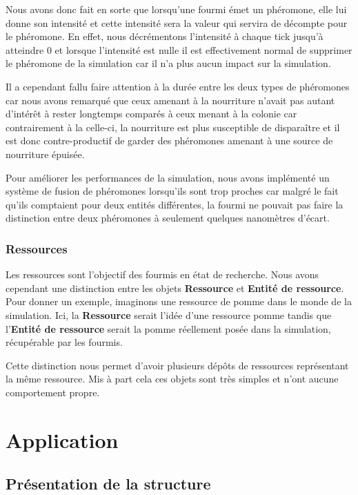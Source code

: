 \documentclass{EPUProjetDi}
\begin{document}
Nous avons donc fait en sorte que lorsqu'une fourmi émet un phéromone, elle lui donne son intensité et cette intensité sera la valeur qui servira de décompte
pour le phéromone. En effet, nous décrémentons l'intensité à chaque tick jusqu'à atteindre 0 et lorsque l'intensité est nulle il est effectivement normal 
de supprimer le phéromone de la simulation car il n'a plus aucun impact sur la simulation.

Il a cependant fallu faire attention à la durée entre les deux types de phéromones car nous avons remarqué que ceux amenant à la nourriture n'avait 
pas autant d'intérêt à rester longtemps comparés à ceux menant à la colonie car contrairement à la celle-ci, la nourriture est plus susceptible de 
disparaître et il est donc contre-productif de garder des phéromones amenant à une source de nourriture épuisée.

Pour améliorer les performances de la simulation, nous avons implémenté un système de fusion de phéromones lorsqu'ils sont trop proches car malgré 
le fait qu'ils comptaient pour deux entités différentes, la fourmi ne pouvait pas faire la distinction entre deux phéromones à seulement quelques 
nanomètres d'écart.

\subsubsection{Ressources}

Les ressources sont l'objectif des fourmis en état de recherche. Nous avons cependant une distinction entre les objets \textbf{Ressource} et 
\textbf{Entité de ressource}. Pour donner un exemple, imaginons une ressource de pomme dans le monde de la simulation. Ici, la \textbf{Ressource}
serait l'idée d'une ressource pomme tandis que l'\textbf{Entité de ressource} serait la pomme réellement posée dans la simulation, récupérable par 
les fourmis.

Cette distinction nous permet d'avoir plusieurs dépôts de ressources représentant la même ressource. Mis à part cela ces objets sont très simples
et n'ont aucune comportement propre.

\section{Application}

\subsection{Présentation de la structure}
\end{document}

